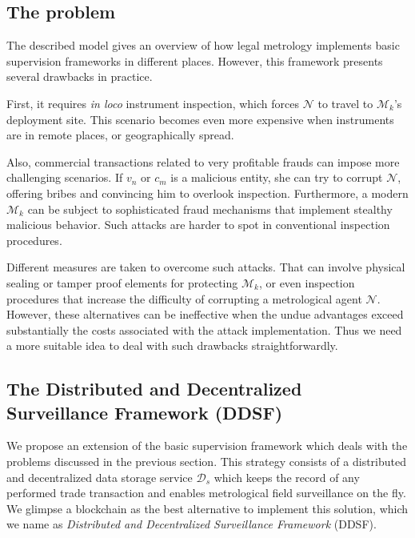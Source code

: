 \documentclass[sigplan]{acmart}
\begin{document}
\subsection{The problem}
The described model gives an overview of how legal metrology implements basic supervision frameworks in different places.
However, this framework presents several drawbacks in practice.

First, it requires \textit{in loco} instrument inspection, which forces $\mathcal{N}$ to travel to $\mathcal{M}_k$'s deployment site.
This scenario becomes even more expensive when instruments are in remote places, or geographically spread.

Also, commercial transactions related to very profitable frauds can impose more challenging scenarios.
If $v_n$ or $c_m$ is a malicious entity, she can try to corrupt $\mathcal{N}$, offering bribes and convincing him to overlook inspection.
Furthermore, a modern $\mathcal{M}_k$ can be subject to sophisticated fraud mechanisms that implement stealthy malicious behavior.
Such attacks are harder to spot in conventional inspection procedures.

Different measures are taken to overcome such attacks.
That can involve physical sealing or tamper proof elements for protecting $\mathcal{M}_k$, or even inspection procedures that increase the difficulty of corrupting a metrological agent $\mathcal{N}$.
However, these alternatives can be ineffective when the undue advantages exceed substantially the costs associated with the attack implementation.
Thus we need a more suitable idea to deal with such drawbacks straightforwardly.

\subsection{The Distributed and Decentralized Surveillance Framework (DDSF)}
We propose an extension of the basic supervision framework which deals with the problems discussed in the previous section.
This strategy consists of a distributed and decentralized data storage service $\mathcal{D}_s$ which keeps the record of any performed trade transaction and enables metrological field surveillance on the fly.
We glimpse a blockchain as the best alternative to implement this solution, which we name as \emph{Distributed and Decentralized Surveillance Framework} (DDSF).
\end{document}
